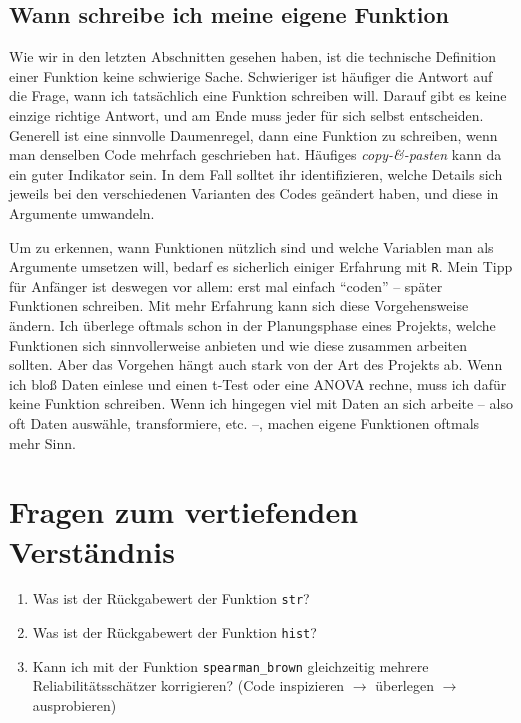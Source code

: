 \documentclass[12pt,]{tufte-book}
\providecommand{\tightlist}{%
  \setlength{\itemsep}{0pt}\setlength{\parskip}{0pt}}
\theoremstyle{definition}
\theoremstyle{definition}
\theoremstyle{definition}
\theoremstyle{remark}
\begin{document}
\subsection{Wann schreibe ich meine eigene
Funktion}\label{wann-schreibe-ich-meine-eigene-funktion}

Wie wir in den letzten Abschnitten gesehen haben, ist die technische
Definition einer Funktion keine schwierige Sache. Schwieriger ist
häufiger die Antwort auf die Frage, wann ich tatsächlich eine Funktion
schreiben will. Darauf gibt es keine einzige richtige Antwort, und am
Ende muss jeder für sich selbst entscheiden. Generell ist eine sinnvolle
Daumenregel, dann eine Funktion zu schreiben, wenn man denselben Code
mehrfach geschrieben hat. Häufiges \emph{copy-\&-pasten} kann da ein
guter Indikator sein. In dem Fall solltet ihr identifizieren, welche
Details sich jeweils bei den verschiedenen Varianten des Codes geändert
haben, und diese in Argumente umwandeln.

Um zu erkennen, wann Funktionen nützlich sind und welche Variablen man
als Argumente umsetzen will, bedarf es sicherlich einiger Erfahrung mit
\texttt{R}. Mein Tipp für Anfänger ist deswegen vor allem: erst mal
einfach ``coden'' -- später Funktionen schreiben. Mit mehr Erfahrung
kann sich diese Vorgehensweise ändern. Ich überlege oftmals schon in der
Planungsphase eines Projekts, welche Funktionen sich sinnvollerweise
anbieten und wie diese zusammen arbeiten sollten. Aber das Vorgehen
hängt auch stark von der Art des Projekts ab. Wenn ich bloß Daten
einlese und einen t-Test oder eine ANOVA rechne, muss ich dafür keine
Funktion schreiben. Wenn ich hingegen viel mit Daten an sich arbeite --
also oft Daten auswähle, transformiere, etc. --, machen eigene
Funktionen oftmals mehr Sinn.

\section{Fragen zum vertiefenden
Verständnis}\label{fragen-zum-vertiefenden-verstuxe4ndnis-3}

\begin{enumerate}
\def\labelenumi{\arabic{enumi}.}
\tightlist
\item
  Was ist der Rückgabewert der Funktion \texttt{str}?
\item
  Was ist der Rückgabewert der Funktion \texttt{hist}?
\item
  Kann ich mit der Funktion \texttt{spearman\_brown} gleichzeitig
  mehrere Reliabilitätsschätzer korrigieren? (Code inspizieren \(\to\)
  überlegen \(\to\) ausprobieren)
\end{enumerate}
\end{document}
